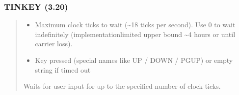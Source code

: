 \documentclass[letterpaper,10pt,english]{sphinxmanual}
\begin{document}
\subsubsection{TINKEY (3.20)}
\label{\detokenize{ppl:tinkey-3-20}}\begin{quote}

\sphinxAtStartPar
{}
\begin{description}
\begin{itemize}
\item {} 
\sphinxAtStartPar
{} \textendash{} Maximum clock ticks to wait (\textasciitilde{}18 ticks per second).
Use 0 to wait indefinitely (implementation\textendash{}limited upper bound \textasciitilde{}4 hours or until carrier loss).

\end{itemize}

\begin{itemize}
\item {} 
\sphinxAtStartPar
{} \textendash{} Key pressed (special names like UP / DOWN / PGUP) or empty string if timed out

\end{itemize}

\sphinxAtStartPar
Waits for user input for up to the specified number of clock ticks.

\end{description}

\sphinxAtStartPar
{}
\begin{quote}

\begin{sphinxVerbatim}[commandchars=\\\{\}]
 
 
  
    
     
      
\end{sphinxVerbatim}
\end{quote}
\end{quote}
\end{document}
